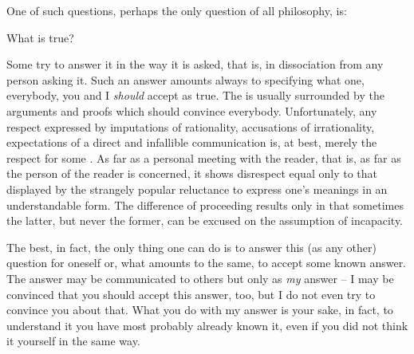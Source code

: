 %

\tsep{}

One of such questions, perhaps the only question of all philosophy, is:
%
\begin{center}What is true?\end{center}
%
Some try to answer it in the way it is asked, that is, in
dissociation from any person asking it. Such an answer amounts always to
specifying what one, everybody, you and I {\em should} accept as true.
The  is usually surrounded by the arguments and proofs which should
convince everybody. 
Unfortunately, any respect expressed by imputations of rationality, accusations of
irrationality, expectations of a direct and infallible communication is, 
 at best, merely the respect for some . As far as 
a personal meeting with the reader, that is, as far as the person of the reader
is concerned, it shows disrespect equal only to that displayed by the strangely popular
reluctance to express one's meanings in an understandable form. The difference
of proceeding results only in that sometimes the latter, but never the former,
can be excused on the assumption of incapacity. 

The best, in fact, the only thing one can do is to answer this (as any other)
question for oneself or, what amounts to the same, to accept some known answer.
The answer may be communicated to others but only as {\em my} answer -- I may be
convinced that you should accept this answer, too, but I do not even try to
convince you about that. What you do with my answer is your sake, in fact, to
understand it you have most probably already known it, even if you did not think
it yourself in the same way. 

